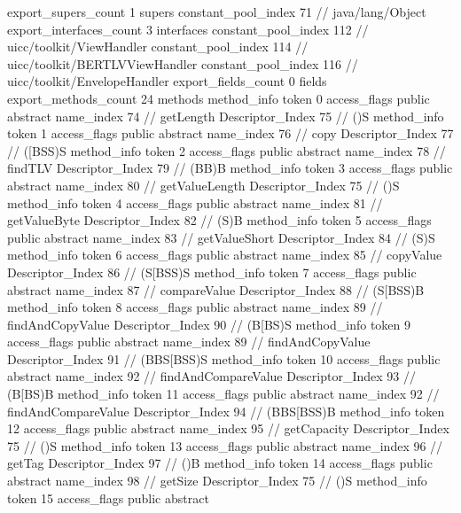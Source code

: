 {{{			export_supers_count	1
			supers {
				constant_pool_index	71		// java/lang/Object
			}
			export_interfaces_count	3
			interfaces {
				constant_pool_index	112		// uicc/toolkit/ViewHandler
				constant_pool_index	114		// uicc/toolkit/BERTLVViewHandler
				constant_pool_index	116		// uicc/toolkit/EnvelopeHandler
			}
			export_fields_count	0
			fields {
			}
			export_methods_count	24
			methods {
				method_info {
					token	0
					access_flags	public abstract
					name_index	74		// getLength
					Descriptor_Index	75		// ()S
				}
				method_info {
					token	1
					access_flags	public abstract
					name_index	76		// copy
					Descriptor_Index	77		// ([BSS)S
				}
				method_info {
					token	2
					access_flags	public abstract
					name_index	78		// findTLV
					Descriptor_Index	79		// (BB)B
				}
				method_info {
					token	3
					access_flags	public abstract
					name_index	80		// getValueLength
					Descriptor_Index	75		// ()S
				}
				method_info {
					token	4
					access_flags	public abstract
					name_index	81		// getValueByte
					Descriptor_Index	82		// (S)B
				}
				method_info {
					token	5
					access_flags	public abstract
					name_index	83		// getValueShort
					Descriptor_Index	84		// (S)S
				}
				method_info {
					token	6
					access_flags	public abstract
					name_index	85		// copyValue
					Descriptor_Index	86		// (S[BSS)S
				}
				method_info {
					token	7
					access_flags	public abstract
					name_index	87		// compareValue
					Descriptor_Index	88		// (S[BSS)B
				}
				method_info {
					token	8
					access_flags	public abstract
					name_index	89		// findAndCopyValue
					Descriptor_Index	90		// (B[BS)S
				}
				method_info {
					token	9
					access_flags	public abstract
					name_index	89		// findAndCopyValue
					Descriptor_Index	91		// (BBS[BSS)S
				}
				method_info {
					token	10
					access_flags	public abstract
					name_index	92		// findAndCompareValue
					Descriptor_Index	93		// (B[BS)B
				}
				method_info {
					token	11
					access_flags	public abstract
					name_index	92		// findAndCompareValue
					Descriptor_Index	94		// (BBS[BSS)B
				}
				method_info {
					token	12
					access_flags	public abstract
					name_index	95		// getCapacity
					Descriptor_Index	75		// ()S
				}
				method_info {
					token	13
					access_flags	public abstract
					name_index	96		// getTag
					Descriptor_Index	97		// ()B
				}
				method_info {
					token	14
					access_flags	public abstract
					name_index	98		// getSize
					Descriptor_Index	75		// ()S
				}
				method_info {
					token	15
					access_flags	public abstract
}}}}}

